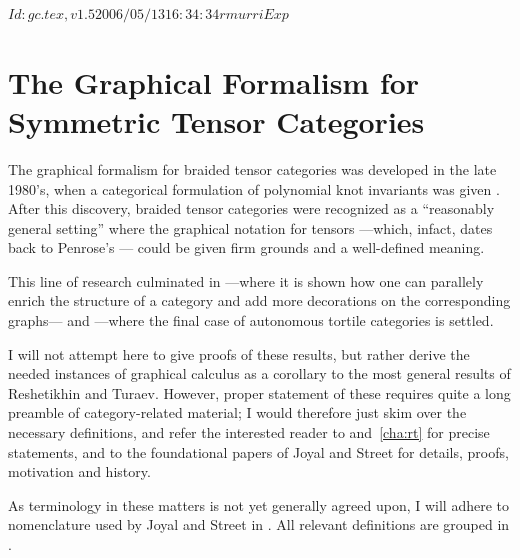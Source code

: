 \RCSID $Id: gc.tex,v 1.5 2006/05/13 16:34:34 rmurri Exp $


\chapter{The Graphical Formalism for Symmetric Tensor Categories}
\label{cha:gc}

The graphical formalism for braided tensor categories was developed in
the late 1980's, when a categorical formulation of polynomial knot
invariants was given \cite{freyd-yetter;btc, turaev;yang-baxter}.
After this discovery, braided tensor categories were recognized as a
``reasonably general setting'' \cite{joyal-street;tensor-calculus}
where the graphical notation for tensors ---which, infact, dates back
to Penrose's \cite{penrose;negative-dimensional-tensors}--- could be
given firm grounds and a well-defined meaning.

This line of research culminated in
\cite{joyal-street;tensor-calculus} ---where it is shown how one can
parallely enrich the structure of a category and add more decorations
on the corresponding graphs--- and
\cite{reshetikhin-turaev;ribbon-graphs} ---where the final case of
autonomous tortile categories is settled.

I will not attempt here to give proofs of these results, but rather
derive the needed instances of graphical calculus as a
corollary to the most general results of Reshetikhin and Turaev.
However, proper statement of these requires quite a long preamble of
category-related material; I would therefore just skim over the
necessary definitions, and refer the interested reader to
 and~\ref{cha:rt} for precise statements, and to the
foundational papers of Joyal and Street
\cite{joyal-street;tensor-calculus, joyal-street;btc} for details,
proofs, motivation and history.

As terminology in these matters is not yet generally agreed upon, I
will adhere to nomenclature used by Joyal and Street in
\cite{joyal-street;tensor-calculus, joyal-street;btc}. All relevant
definitions are grouped in .



